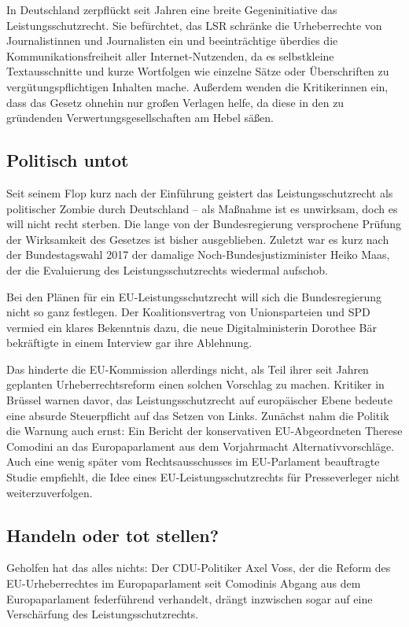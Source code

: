 \documentclass[9pt, a4paper]{scrartcl}
\newcommand{\keineNr}[1][-1]{\addtocounter{linenumber}{#1}}
\begin{document}
\begin{zeilenNrZweispaltig}
In Deutschland zerpflückt seit Jahren eine breite Gegeninitiative das Leistungsschutzrecht. Sie befürchtet, das LSR schränke die Urheberrechte von Journalistinnen und Journalisten ein und beeinträchtige überdies die Kommunikationsfreiheit aller Internet-Nutzenden, da es selbstkleine Textausschnitte und kurze Wortfolgen wie einzelne Sätze oder Überschriften zu vergütungspflichtigen Inhalten mache. Außerdem wenden die Kritikerinnen ein, dass das Gesetz ohnehin nur großen Verlagen helfe, da diese in den zu gründenden Verwertungsgesellschaften am Hebel säßen.

\subsection*{Politisch untot}\keineNr
Seit seinem Flop kurz nach der Einführung geistert das Leistungsschutzrecht als politischer Zombie durch Deutschland – als Maßnahme ist es unwirksam, doch es will nicht recht sterben. Die lange von der Bundesregierung versprochene Prüfung der Wirksamkeit des Gesetzes ist bisher ausgeblieben. Zuletzt war es kurz nach der Bundestagswahl 2017 der damalige Noch-Bundesjustizminister Heiko Maas, der die Evaluierung des Leistungsschutzrechts wiedermal aufschob.

Bei den Plänen für ein EU-Leistungsschutzrecht will sich die Bundesregierung nicht so ganz festlegen. Der Koalitionsvertrag von Unionsparteien und SPD vermied ein klares Bekenntnis dazu, die neue Digitalministerin Dorothee Bär bekräftigte in einem Interview gar ihre Ablehnung.

Das hinderte die EU-Kommission allerdings nicht, als Teil ihrer seit Jahren geplanten Urheberrechtsreform einen solchen Vorschlag zu machen. Kritiker in Brüssel warnen davor, das Leistungsschutzrecht auf europäischer Ebene bedeute eine absurde Steuerpflicht auf das Setzen von Links. Zunächst nahm die Politik die Warnung auch ernst: Ein Bericht der konservativen EU-Abgeordneten Therese Comodini an das Europaparlament aus dem Vorjahrmacht Alternativvorschläge. Auch eine wenig später vom Rechtsausschusses im EU-Parlament beauftragte Studie empfiehlt, die Idee eines EU-Leistungsschutzrechts für Presseverleger nicht weiterzuverfolgen.

\subsection*{Handeln oder tot stellen?}\keineNr
Geholfen hat das alles nichts: Der CDU-Politiker Axel Voss, der die Reform des EU-Urheberrechtes im Europaparlament seit Comodinis Abgang aus dem Europaparlament federführend verhandelt, drängt inzwischen sogar auf eine Verschärfung des Leistungsschutzrechts.


\end{zeilenNrZweispaltig}
\end{document}
